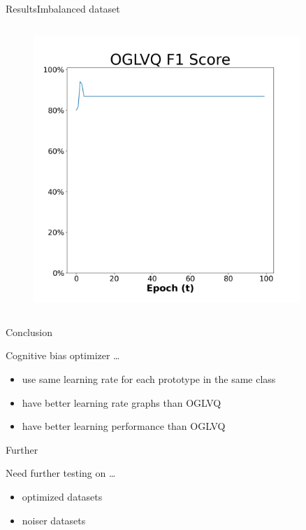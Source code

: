 \documentclass[
	aspectratio=169,	%
	onlytextwidth,		%
	t,					%
	]{beamer}
\begin{document}
\begin{frame}[fragile]{Results}{Imbalanced dataset}
\begin{columns}
			\begin{column}[T]{0.33\textwidth}
				\begin{figure}
					\includegraphics[width=0.9\textwidth]{myfigs/OGLVQ_i_res.png}
				\end{figure}
			\end{column}
		
			
		\end{columns}
		
	
	\end{frame}
	
	
	\begin{frame}[fragile]{Conclusion}
		
		Cognitive bias optimizer \ldots 
		\begin{itemize}
			\item <1-> use same learning rate for each prototype in the same class
			\item <2-> have better learning rate graphs than OGLVQ
			\item <3->  have better learning performance than OGLVQ

		\end{itemize}
		
	\end{frame}

	\begin{frame}[fragile]{Further}
	
		Need further testing on \ldots
		\begin{itemize}

			\item <1-> optimized datasets
			\item <2-> noiser datasets

		\end{itemize}


	\end{frame}

	
	\appendix
	
	\makebibliography

	\makethankyou
\end{document}
